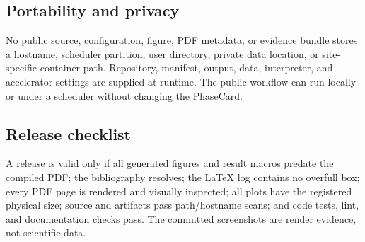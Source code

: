 \subsection{Portability and privacy}

No public source, configuration, figure, PDF metadata, or evidence bundle stores
a hostname, scheduler partition, user directory, private data location, or
site-specific container path. Repository, manifest, output, data, interpreter,
and accelerator settings are supplied at runtime. The public workflow can run
locally or under a scheduler without changing the PhaseCard.

\subsection{Release checklist}

A release is valid only if all generated figures and result macros predate the
compiled PDF; the bibliography resolves; the LaTeX log contains no overfull box;
every PDF page is rendered and visually inspected; all plots have the registered
physical size; source and artifacts pass path/hostname scans; and code tests,
lint, and documentation checks pass. The committed screenshots are render
evidence, not scientific data.

\FloatBarrier
